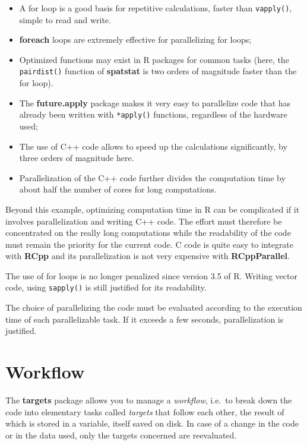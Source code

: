 \documentclass[
  12pt,
  american,
  a4paper,
  extrafontsizes,onecolumn,openright
  ]{memoir}
\providecommand{\tightlist}{%
  \setlength{\itemsep}{0pt}\setlength{\parskip}{0pt}}
\begin{document}
\begin{itemize}
\tightlist
\item
  A for loop is a good basis for repetitive calculations, faster than \texttt{vapply()}, simple to read and write.
\item
  \textbf{foreach} loops are extremely effective for parallelizing for loops;
\item
  Optimized functions may exist in R packages for common tasks (here, the \texttt{pairdist()} function of \textbf{spatstat} is two orders of magnitude faster than the for loop).
\item
  The \textbf{future.apply} package makes it very easy to parallelize code that has already been written with \texttt{*apply()} functions, regardless of the hardware used;
\item
  The use of C++ code allows to speed up the calculations significantly, by three orders of magnitude here.
\item
  Parallelization of the C++ code further divides the computation time by about half the number of cores for long computations.
\end{itemize}

Beyond this example, optimizing computation time in R can be complicated if it involves parallelization and writing C++ code.
The effort must therefore be concentrated on the really long computations while the readability of the code must remain the priority for the current code.
C code is quite easy to integrate with \textbf{RCpp} and its parallelization is not very expensive with \textbf{RCppParallel}.

The use of for loops is no longer penalized since version 3.5 of R.
Writing vector code, using \texttt{sapply()} is still justified for its readability.

The choice of parallelizing the code must be evaluated according to the execution time of each parallelizable task.
If it exceeds a few seconds, parallelization is justified.

\section{Workflow}\label{sec:targets}

The \textbf{targets} package allows you to manage a \emph{workflow}, i.e.~to break down the code into elementary tasks called \emph{targets} that follow each other, the result of which is stored in a variable, itself saved on disk.
In case of a change in the code or in the data used, only the targets concerned are reevaluated.
\end{document}
